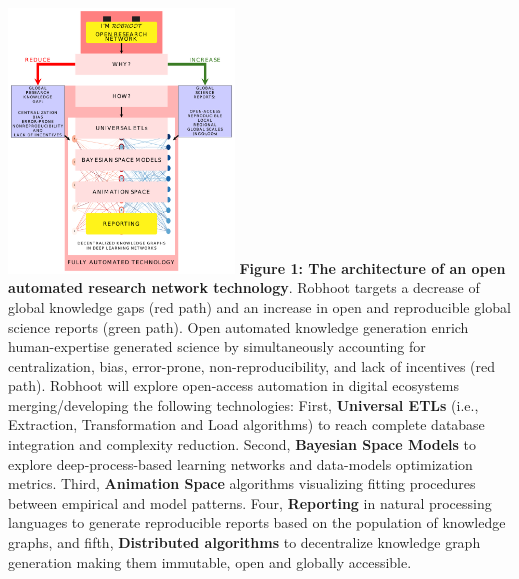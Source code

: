 \documentclass[10pt, a4paper, twocolumn]{article} %
\begin{document}
{\vspace{0.15 in} \includegraphics[width=0.45\textwidth]{flowchart.pdf}
{\small {\bf Figure 1: The architecture of an open automated research
    network technology}. Robhoot targets a decrease of global
  knowledge gaps (red path) and an increase in open and reproducible
  global science reports (green path). Open automated knowledge
  generation enrich human-expertise generated science by
  simultaneously accounting for centralization, bias, error-prone,
  non-reproducibility, and lack of incentives (red path). Robhoot will
  explore open-access automation in digital ecosystems
  merging/developing the following technologies: First, {\bf Universal
    ETLs} (i.e., Extraction, Transformation and Load algorithms) to
  reach complete database integration and complexity
  reduction. Second, {\bf Bayesian Space Models} to explore
  deep-process-based learning networks and data-models optimization
  metrics. Third, {\bf Animation Space} algorithms visualizing fitting
  procedures between empirical and model patterns. Four, {\bf
    Reporting} in natural processing languages to generate
  reproducible reports based on the population of knowledge graphs,
  and fifth, {\bf Distributed algorithms} to decentralize knowledge
  graph generation making them immutable, open and globally
  accessible.}

}
\end{document}
